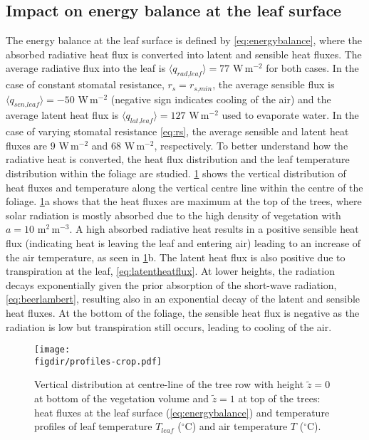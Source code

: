 \subsection{Impact on energy balance at the leaf surface}

The energy balance at the leaf surface is defined by \cref{eq:energybalance}, where the absorbed radiative heat flux is converted into latent and sensible heat fluxes. The average radiative flux into the leaf is $\langle q_{\textit{rad,leaf}} \rangle =77$ W\,m$^{-2}$ for both cases. In the case of constant stomatal resistance, $r_s=r_{\textit{s,min}}$, the average sensible flux is $\langle q_{\textit{sen,leaf}} \rangle = -50$ W\,m$^{-2}$ (negative sign indicates cooling of the air) and the average latent heat flux is $\langle q_{\textit{lat,leaf}} \rangle =127$ W\,m$^{-2}$ used to evaporate water. In the case of varying stomatal resistance \cref{eq:rs}, the average sensible and latent heat fluxes are $9$ W\,m$^{-2}$ and $68$ W\,m$^{-2}$, respectively. To better understand how the radiative heat is converted, the heat flux distribution and the leaf temperature distribution within the foliage are studied. \cref{fig:profiles} shows the vertical distribution of heat fluxes and temperature along the vertical centre line within the centre of the foliage. \cref{fig:profiles}a shows that the heat fluxes are maximum at the top of the trees, where solar radiation is mostly absorbed due to the high density of vegetation with $a=10$ m$^2$\,m$^{-3}$. A high absorbed radiative heat results in a positive sensible heat flux (indicating heat is leaving the leaf and entering air) leading to an increase of the air temperature, as seen in \cref{fig:profiles}b. The latent heat flux is also positive due to transpiration at the leaf, \cref{eq:latentheatflux}. At lower heights, the radiation decays exponentially given the prior absorption of the short-wave radiation, \cref{eq:beerlambert}, resulting also in an exponential decay of the latent and sensible heat fluxes. At the bottom of the foliage, the sensible heat flux is negative as the radiation is low but transpiration still occurs, leading to cooling of the air. 

	\begin{figure}[t]
	\centering
	\texttt{[image: \\figdir/profiles-crop.pdf]}
	\caption{Vertical distribution at centre-line of the tree row with height  $\tilde{z}=0$ at bottom of the vegetation volume and  $\tilde{z}=1$ at top of the trees:  heat fluxes at the leaf surface (\cref{eq:energybalance}) and  temperature profiles of leaf temperature $T_{\textit{leaf}}$ ($^{\circ}$C) and air temperature $T$ ($^{\circ}$C).}
	\label{fig:profiles}
	\end{figure}

